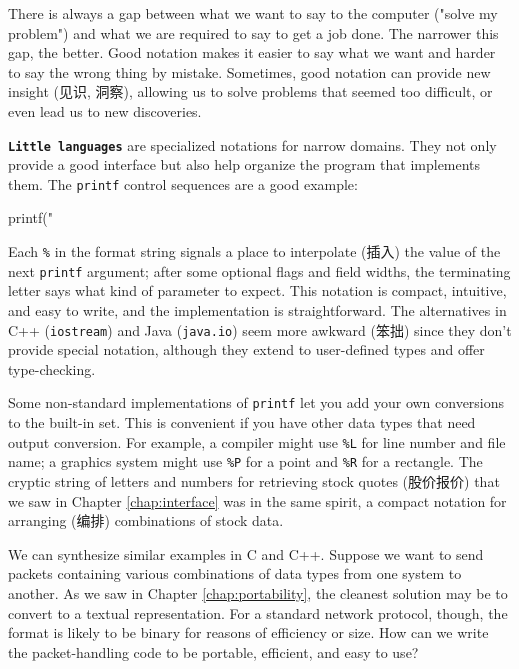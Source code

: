 There is always a gap between what we want to say to the computer ("solve
my problem") and what we are required to say to get a job done. The
narrower this gap, the better. Good notation makes it easier to say what we
want and harder to say the wrong thing by mistake. Sometimes, good notation
can provide new insight (见识, 洞察), allowing us to solve problems that
seemed too difficult, or even lead us to new discoveries.

\textbf{\texttt{Little languages}} are specialized notations for narrow
domains. They not only provide a good interface but also help organize the
program that implements them. The \verb'printf' control sequences are a
good example:
\begin{wellcode}
    printf("%
\end{wellcode}

Each \verb'%' in the format string signals a place to interpolate (插入)
the value of the next \verb'printf' argument; after some optional flags and
field widths, the terminating letter says what kind of parameter to expect.
This notation is compact, intuitive, and easy to write, and the
implementation is straightforward. The alternatives in C++
(\verb'iostream') and Java (\verb'java.io') seem more awkward (笨拙) since
they don't provide special notation, although they extend to user-defined
types and offer type-checking.

Some non-standard implementations of \verb'printf' let you add your own
conversions to the built-in set. This is convenient if you have other data
types that need output conversion. For example, a compiler might use
\verb'%L' for line number and file name; a graphics system might use
\verb'%P' for a point and \verb'%R' for a rectangle. The cryptic string of
letters and numbers for retrieving stock quotes (股价报价) that we saw in
Chapter \ref{chap:interface} was in the same spirit, a compact notation for
arranging (编排) combinations of stock data.

We can synthesize similar examples in C and C++. Suppose we want to send
packets containing various combinations of data types from one system to
another.  As we saw in Chapter \ref{chap:portability}, the cleanest
solution may be to convert to a textual representation. For a standard
network protocol, though, the format is likely to be binary for reasons of
efficiency or size. How can we write the packet-handling code to be
portable, efficient, and easy to use?

